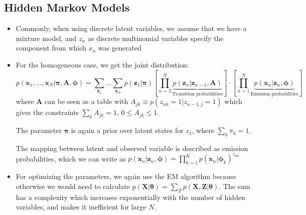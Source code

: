 \subsection{Hidden Markov Models}
\begin{itemize}
	\item Commonly, when using discrete latent variables, we assume that we have a mixture model, and $z_n$ as discrete multinomial variables specify the component from which $x_n$ was generated
	\item For the homogeneous case, we get the joint distribution:
	$$p(\bm{x}_1,...,\bm{x}_N|\bm{\pi},\bm{A},\bm{\phi}) = \sum_{\bm{z}_1}...\sum_{\bm{z}_N} p(\bm{z}_1|\bm{\pi})\left[\prod_{n=2}^{N} \underbrace{p(\bm{z}_n|\bm{z}_{n-1},\bm{A})}_{\text{Transition probabilities}}\right]\cdot \left[\prod_{n=1}^{N} \underbrace{p(\bm{x}_n|\bm{z}_n,\bm{\phi})}_{\text{Emission probabilities}}\right]$$
	where $\bm{A}$ can be seen as a table with $A_{jk}\equiv p(z_{nk}=1|z_{n-1,j}=1)$ which gives the constraints $\sum_k A_{jk}=1$, $0\leq A_{jk}\leq 1$. 
	
	The parameter $\bm{\pi}$ is again a prior over latent states for $z_1$, where $\sum_k \pi_k = 1$.
	
	The mapping between latent and observed variable is described as emission probabilities, which we can write as $p(\bm{x}_n|\bm{z}_n,\bm{\phi})=\prod_{k=1}^{K} p(\bm{x}_n|\bm{\phi}_k)^{z_{nk}}$
	
	\item For optimizing the parameters, we again use the EM algorithm because otherwise we would need to calculate $p(\bm{X}|\bm{\theta})=\sum_Z p(\bm{X},\bm{Z}|\bm{\theta})$. The sum has a complexity which increases exponentially with the number of hidden variables, and makes it inefficient for large $N$.
	
\end{itemize}
